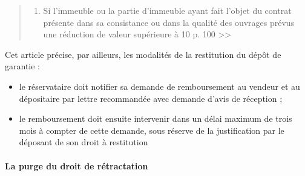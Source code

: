 \begin{enumerate}
\begin{itemize}
\begin{quote}
{\begin{enumerate}[label=\alph*)]
										\item Si l'immeuble ou la partie d'immeuble ayant fait l'objet du contrat présente dans sa consistance ou dans la qualité des ouvrages prévus une réduction de valeur supérieure à 10 p. 100 >>
									\end{enumerate}}
								\end{quote}

								Cet article précise, par ailleurs, les modalités de la restitution du dépôt de garantie :
								\begin{itemize}
									\item le réservataire doit notifier sa demande de remboursement au vendeur et au dépositaire par lettre recommandée avec demande d'avis de réception ;
									\item le remboursement doit ensuite intervenir dans un délai maximum de trois mois à compter de cette demande, sous réserve de la justification par le déposant de son droit à restitution
								\end{itemize}
						\end{itemize}
					\end{enumerate}

			\paragraph{La purge du droit de rétractation}

